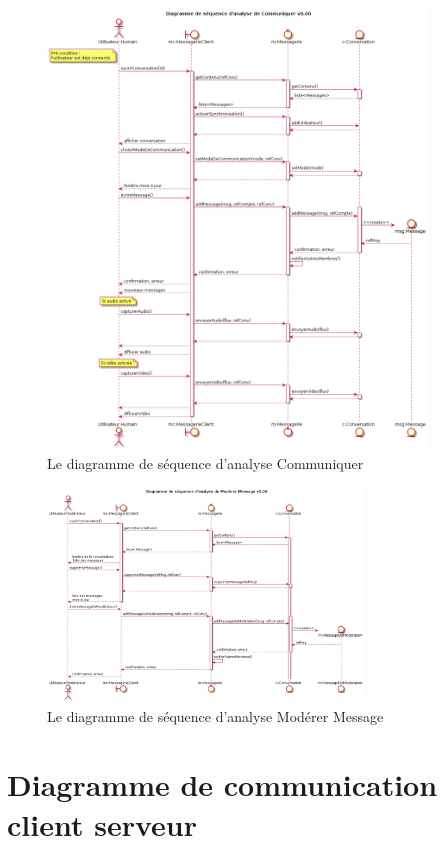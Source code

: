 \documentclass[11pt,dvipsnames,svgnames]{report}
\begin{document}
\begin{figure}[H]
\centerline{\includegraphics[width=0.9\textwidth]{diagrammes/dsa-communiquer.png}}
\caption{Le diagramme de séquence d'analyse \og Communiquer \fg}
\end{figure}

\begin{figure}[H]
\centerline{\includegraphics[width=0.75\textwidth]{diagrammes/dsa-moderer.png}}
\caption{Le diagramme de séquence d'analyse \og Modérer Message \fg}
\end{figure}

\section{Diagramme de communication client serveur}
\end{document}
